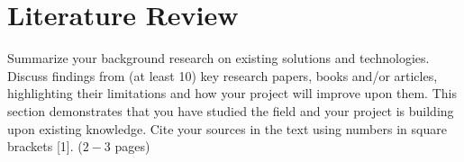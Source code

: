 
\chapter{Literature Review}
\label{Chapter4}

Summarize your background research on existing solutions and technologies. Discuss findings from (at least 10) key research papers, books and/or articles, highlighting their limitations and how your project will improve upon them. This section demonstrates that you have studied the field and your project is building upon existing knowledge. Cite your sources in the text using numbers in square brackets [1]. ($2-3$ pages)


